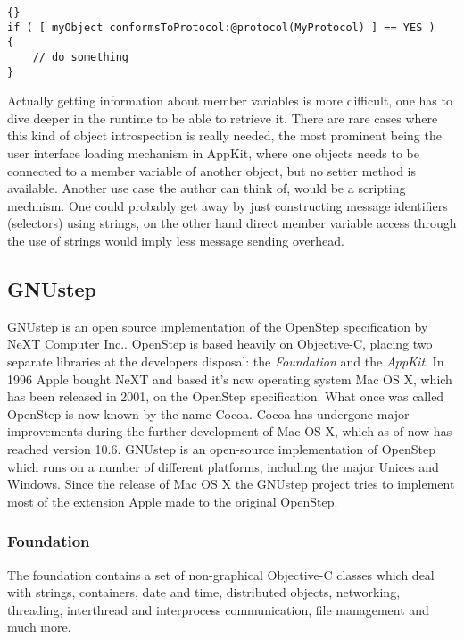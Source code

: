\begin{lstlisting}[captionpos=b, caption=Check if an object implements a
specific protocol.,
label=lst_objcinstanceimplementsprotocol]{}
if ( [ myObject conformsToProtocol:@protocol(MyProtocol) ] == YES )
{
    // do something
}
\end{lstlisting}

Actually getting information about member variables is more difficult, one has
to dive deeper in the runtime to be able to retrieve it. There are rare cases
where this kind of object introspection is really needed, the most prominent
being the user interface loading mechanism in AppKit, where one objects needs
to be connected to a member variable of another object, but no setter method is
available. Another use case the author can think of, would be a scripting
mechnism. One could probably get away by just constructing message identifiers
(selectors) using strings, on the other hand direct member variable access
through the use of strings would imply less message sending overhead.

\subsection{GNUstep}
GNUstep is an open source implementation of the OpenStep
specification\cite{misc:OpenStepSpec} by NeXT Computer Inc.\cite{misc:NeXT}.
OpenStep is based heavily on Objective-C, placing two separate libraries at
the developers disposal: the \textit{Foundation} and the \textit{AppKit}. In
1996 Apple bought NeXT and based it's new operating system Mac OS X, which has
been released in 2001, on the OpenStep specification. What once was called
OpenStep is now known by the name Cocoa. Cocoa has undergone major improvements
during the further development of Mac OS X, which as of now has reached version
10.6. GNUstep is an open-source implementation of OpenStep which runs on a
number of different platforms, including the major Unices and Windows. Since
the release of Mac OS X the GNUstep project tries to implement most of the
extension Apple made to the original OpenStep.

\subsubsection{Foundation}

The foundation contains a set of non-graphical Objective-C classes which deal
with strings, containers, date and time, distributed objects, networking,
threading,  interthread and interprocess communication, file management and
much more.

